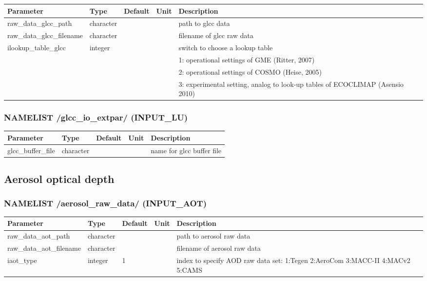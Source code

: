 \documentclass[a4paper,10pt,DIV14,BCOR1cm,titlepage,twoside]{scrartcl}
\providecommand{\tabularnewline}{\\}
\begin{document}
\begin{longtable}{|p{4cm}|p{1.5cm}|p{1.5cm}|p{1cm}|p{6cm}|}
\hline 
\textbf{Parameter}& \textbf{Type}&\textbf{Default}& \textbf{Unit}& \textbf{Description}
\tabularnewline
\hline
\endhead
\hline 
raw\_data\_glcc\_path & character & &  & path to glcc data \tabularnewline
\hline 
raw\_data\_glcc\_filename & character & &  & filename of glcc raw data \tabularnewline
\hline
ilookup\_table\_glcc & integer & & &  switch to choose a lookup table
\tabularnewline
 & & & & 1: operational settings of GME (Ritter, 2007)\tabularnewline
 & & & & 2: operational settings of COSMO (Heise, 2005)\tabularnewline
 & & & & 3: experimental setting, analog to look-up tables of ECOCLIMAP (Asensio 2010)\tabularnewline
\hline
\bottomrule
\end{longtable}

\subsubsection*{NAMELIST /glcc\_io\_extpar/ (INPUT\_LU)}
\begin{longtable}{|p{4cm}|p{1.5cm}|p{1.5cm}|p{1cm}|p{6cm}|}
\hline 
\textbf{Parameter}& \textbf{Type}& \textbf{Default}& \textbf{Unit}& \textbf{Description}
\tabularnewline
\hline
\endhead
\hline
glcc\_buffer\_file & character & &  & name for glcc buffer file
\tabularnewline
\bottomrule
\end{longtable}

\subsection{Aerosol optical depth}\label{namelist_input_for_extpar_aot}

\subsubsection*{NAMELIST /aerosol\_raw\_data/ (INPUT\_AOT)}

\begin{longtable}{|p{4cm}|p{1.5cm}|p{1.5cm}|p{1cm}|p{6cm}|}
\hline 
\textbf{Parameter}& \textbf{Type}& \textbf{Default}& \textbf{Unit}& \textbf{Description}
\tabularnewline
\hline
\endhead
\hline 
raw\_data\_aot\_path & character & &  & path to aerosol raw data \tabularnewline
\hline 
raw\_data\_aot\_filename & character & &  & filename of aerosol raw data \tabularnewline
\hline 
iaot\_type & integer &1 &  & index to specify AOD raw data set: 1:Tegen 2:AeroCom 3:MACC-II 4:MACv2 5:CAMS \tabularnewline
\hline
\bottomrule
\end{longtable}
\end{document}
